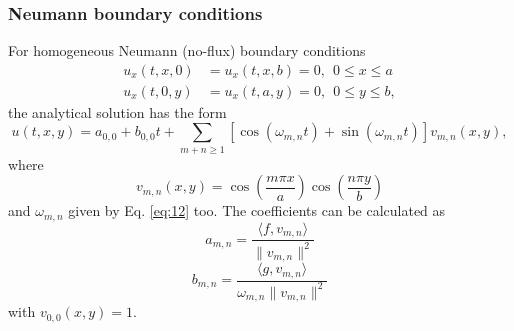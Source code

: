 \documentclass[11pt]{article}
\begin{document}
\subsubsection{Neumann boundary conditions}
For homogeneous Neumann (no-flux) boundary conditions
\begin{align}
  u_x(t,x,0) &= u_x(t,x,b) = 0,~~0 \le x \le a \\
  u_x(t,0,y) &= u_x(t,a,y) = 0,~~0 \le y \le b,  
\end{align}
the analytical solution has the form
\begin{equation}
  \label{eq:13}
  u(t,x,y) = a_{0,0} + b_{0,0}t + \sum_{m + n \ge 1} \left[\cos(\omega_{m,n}t) + \sin(\omega_{m,n}t) \right] v_{m,n}(x,y),
\end{equation}
where
\begin{equation}
  \label{eq:6}
  v_{m,n}(x,y) = \cos\left(\frac{m\pi x}{a} \right)\cos\left(\frac{n\pi y}{b} \right)
\end{equation}
and $\omega_{m,n}$ given by Eq. \eqref{eq:12} too. The coefficients can be calculated as
\begin{equation}
  \label{eq:14}
  a_{m,n} = \frac{\langle f, v_{m,n} \rangle}{\|v_{m,n}\|^2}
\end{equation}
\begin{equation}
  \label{eq:15}
  b_{m,n} = \frac{\langle g, v_{m,n} \rangle}{\omega_{m,n}\|v_{m,n}\|^2}  
\end{equation}
with $v_{0,0}(x,y) = 1$.
\end{document}

